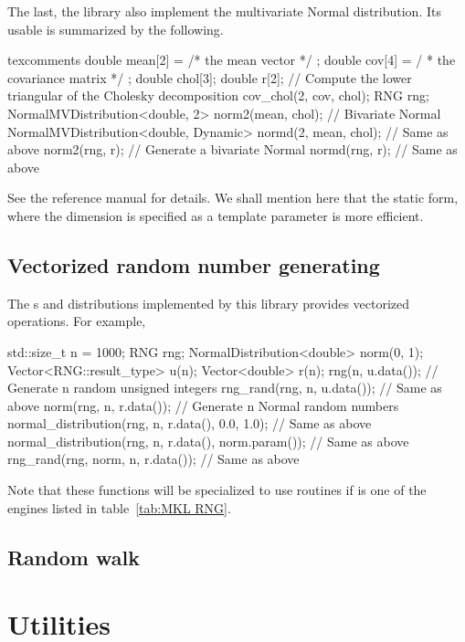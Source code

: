 \documentclass[11pt,bib,mint,hyper,altcolor]{marticle}
\begin{document}
The last, the library also implement the multivariate Normal distribution. Its
usable is summarized by the following.
\begin{cppcode*}{texcomments}
  double mean[2] = { /* the mean vector */ };
  double cov[4] = { / * the covariance matrix */ };
  double chol[3];
  double r[2];
  // Compute the lower triangular of the Cholesky decomposition
  cov_chol(2, cov, chol);
  RNG rng;
  NormalMVDistribution<double, 2> norm2(mean, chol); // Bivariate Normal
  NormalMVDistribution<double, Dynamic> normd(2, mean, chol); // Same as above
  norm2(rng, r); // Generate a bivariate Normal
  normd(rng, r); // Same as above
\end{cppcode*}
See the reference manual for details. We shall mention here that the static
form, where the dimension is specified as a template parameter is more
efficient.

\subsection{Vectorized random number generating}
\label{sub:Vectorized random number generating}

The \rng{}s and distributions implemented by this library provides vectorized
operations. For example,
\begin{cppcode}
  std::size_t n = 1000;
  RNG rng;
  NormalDistribution<double> norm(0, 1);
  Vector<RNG::result_type> u(n);
  Vector<double> r(n);
  rng(n, u.data());           // Generate n random unsigned integers
  rng_rand(rng, n, u.data()); // Same as above
  norm(rng, n, r.data());     // Generate n Normal random numbers
  normal_distribution(rng, n, r.data(), 0.0, 1.0);     // Same as above
  normal_distribution(rng, n, r.data(), norm.param()); // Same as above
  rng_rand(rng, norm, n, r.data());                    // Same as above
\end{cppcode}
Note that these functions will be specialized to use \mkl routines if
 is one of the engines listed in table~\ref{tab:MKL RNG}.

\subsection{Random walk}
\label{sub:Random walk}

\section{Utilities}
\label{sec:Utilities}
\end{document}
